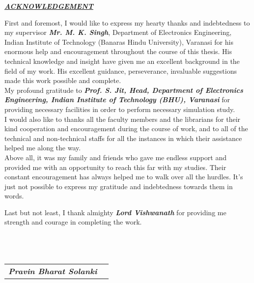 
\begin{center}
\textbf{\textit{{\color{blue}\underline{ACKNOWLEDGEMENT}}}}
\end{center}

	First and foremost, I would like to express my hearty thanks and indebtedness to my supervisor \textbf{\textit{\color{blue} Mr. M. K. Singh}}, Department of Electronics Engineering, Indian Institute of Technology (Banaras Hindu University), Varanasi for his enormous help and encouragement throughout the course of this thesis. His technical knowledge and insight have given me an excellent background in the field of my work. His excellent guidance, perseverance, invaluable suggestions made this work possible and complete.\\
\indent My profound gratitude to \textbf{\textit{\color{blue} Prof. S. Jit, Head, Department of Electronics Engineering, Indian Institute of Technology (BHU), Varanasi}} for providing necessary facilities in order to perform necessary simulation study.\\
\indent		I would also like to thanks all the faculty members and the librarians for their kind cooperation and encouragement during the course of work, and to all of the technical and non-technical staffs for all the instances in which their assistance helped me along the way.\\
\indent		Above all, it was my family and friends who gave me endless support and provided me with an opportunity to reach this far with my studies. Their constant encouragement has always helped me to walk over all the hurdles. It’s just not possible to express my gratitude and indebtedness towards them in words. 

 



Last but not least, I thank almighty \textbf{\textit{\color{blue}Lord Vishwanath}} for providing me strength and courage in completing the work. 
\\
\\
\\
\\
\begin{flushright}
\begin{minipage}[t]{0.40\linewidth}
\begin{tabular}{ll}
\textbf{\textit{Pravin Bharat Solanki}}\\
\end{tabular}
\end{minipage}
\end{flushright}

